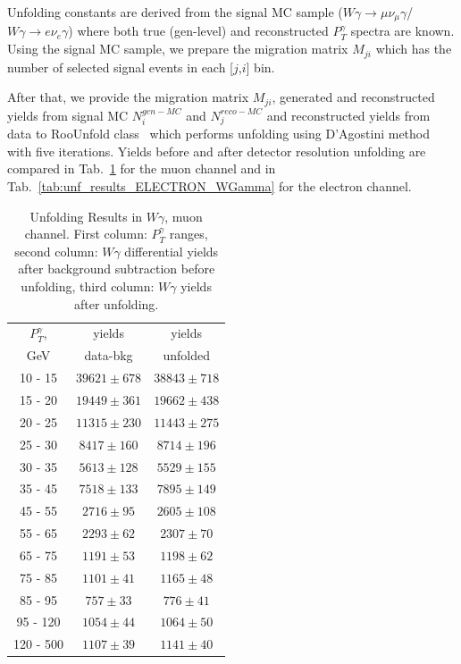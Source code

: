 Unfolding constants are derived from the signal MC sample ($W\gamma\rightarrow\mu\nu_{\mu}\gamma$/$W\gamma\rightarrow{e}\nu_{e}\gamma$) where both true (gen-level) and reconstructed $P_T^\gamma$ spectra are known. Using the signal MC sample, we prepare the migration matrix $M_{ji}$ which has the number of selected signal events in each [$j$,$i$] bin. 

After that, we provide the migration matrix $M_{ji}$, generated and reconstructed yields from signal MC $N^{gen-MC}_i$ and $N^{reco-MC}_j$ and reconstructed yields from data to RooUnfold class~\cite{ref_RooUnfold} which performs unfolding using D'Agostini method with five iterations. Yields before and after detector resolution unfolding are compared in Tab.~\ref{tab:unf_results_MUON_WGamma} for the muon channel and in Tab.~\ref{tab:unf_results_ELECTRON_WGamma} for the electron channel. 

\begin{table}[h]
  \scriptsize
  \begin{center}
  \caption{Unfolding Results in $W\gamma$, muon channel. First column: $P_T^{\gamma}$ ranges, second column: $W\gamma$ differential yields after background subtraction before unfolding, third column: $W\gamma$ yields after unfolding.}
  \begin{tabular}{|c|c|c|}

  $P_T^{\gamma}$, &  yields   &  yields  \\ 
  GeV           &  data-bkg &  unfolded  \\ \hline

 10 -  15 &     $39621\pm 678$ &     $38843\pm 718$  \\ \hline
 15 -  20 &     $19449\pm 361$ &     $19662\pm 438$  \\ \hline
 20 -  25 &     $11315\pm 230$ &     $11443\pm 275$  \\ \hline
 25 -  30 &     $8417\pm 160$ &     $8714\pm 196$  \\ \hline
 30 -  35 &     $5613\pm 128$ &     $5529\pm 155$  \\ \hline
 35 -  45 &     $7518\pm 133$ &     $7895\pm 149$  \\ \hline
 45 -  55 &     $2716\pm  95$ &     $2605\pm 108$  \\ \hline
 55 -  65 &     $2293\pm  62$ &     $2307\pm  70$  \\ \hline
 65 -  75 &     $1191\pm  53$ &     $1198\pm  62$  \\ \hline
 75 -  85 &     $1101\pm  41$ &     $1165\pm  48$  \\ \hline
 85 -  95 &     $757\pm  33$ &     $776\pm  41$  \\ \hline
 95 - 120 &     $1054\pm  44$ &     $1064\pm  50$  \\ \hline
120 - 500 &     $1107\pm  39$ &     $1141\pm  40$  \\ \hline
  \end{tabular}
  \label{tab:unf_results_MUON_WGamma}
  \end{center}
\end{table}

